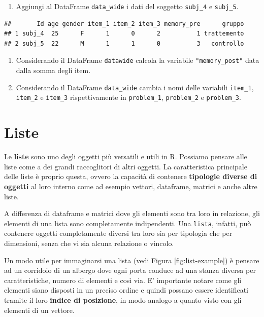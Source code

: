 \documentclass[
]{book}
\providecommand{\tightlist}{%
  \setlength{\itemsep}{0pt}\setlength{\parskip}{0pt}}
\begin{document}
\begin{enumerate}
\def\labelenumi{\arabic{enumi}.}
\setcounter{enumi}{2}
\tightlist
\item
  Aggiungi al DataFrame \texttt{data\_wide} i dati del soggetto \texttt{subj\_4} e \texttt{subj\_5}.
\end{enumerate}

\begin{verbatim}
##       Id age gender item_1 item_2 item_3 memory_pre      gruppo
## 1 subj_4  25      F      1      0      2          1 trattemento
## 2 subj_5  22      M      1      1      0          3   controllo
\end{verbatim}

\begin{enumerate}
\def\labelenumi{\arabic{enumi}.}
\setcounter{enumi}{3}
\tightlist
\item
  Considerando il DataFrame \texttt{datawide} calcola la variabile \texttt{"memory\_post"} data dalla somma degli item.
\item
  Considerando il DataFrame \texttt{data\_wide} cambia i nomi delle variabili \texttt{item\_1}, \texttt{item\_2} e \texttt{item\_3} rispettivamente in \texttt{problem\_1}, \texttt{problem\_2} e \texttt{problem\_3}.
\end{enumerate}

\hypertarget{list}{%
\chapter{Liste}\label{list}}

Le \textbf{liste} sono uno degli oggetti più versatili e utili in R. Possiamo pensare alle liste come a dei grandi raccoglitori di altri oggetti. La caratteristica principale delle liste è proprio questa, ovvero la capacità di contenere \textbf{tipologie diverse di oggetti} al loro interno come ad esempio vettori, dataframe, matrici e anche altre liste.

A differenza di dataframe e matrici dove gli elementi sono tra loro in relazione, gli elementi di una lista sono completamente indipendenti. Una \texttt{lista}, infatti, può contenere oggetti completamente diversi tra loro sia per tipologia che per dimensioni, senza che vi sia alcuna relazione o vincolo.

Un modo utile per immaginarsi una lista (vedi Figura \ref{fig:list-example}) è pensare ad un corridoio di un albergo dove ogni porta conduce ad una stanza diversa per caratteristiche, numero di elementi e così via. E' importante notare come gli elementi siano disposti in un preciso ordine e quindi possano essere identificati tramite il loro \textbf{indice di posizione}, in modo analogo a quanto visto con gli elementi di un vettore.
\end{document}

